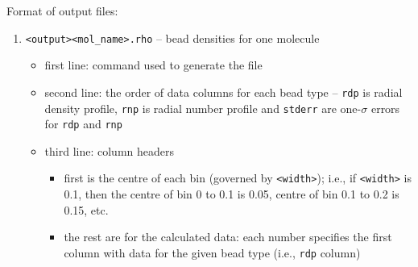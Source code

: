 \noindent
Format of output files:
\begin{enumerate}[nosep,leftmargin=20pt]
  \item \texttt{<output><mol\_name>.rho} -- bead densities for one molecule
    \begin{itemize}[nosep,leftmargin=5pt]
      \item first line: command used to generate the file
      \item second line: the order of data columns for each bead type --
        \texttt{rdp} is radial density profile, \texttt{rnp} is radial number
        profile and \texttt{stderr} are one-$\sigma$ errors for \texttt{rdp}
        and \texttt{rnp}
      \item third line: column headers
        \begin{itemize}[nosep,leftmargin=10pt]
          \item first is the centre of each bin (governed by
            \texttt{<width>}); i.e., if \texttt{<width>} is 0.1,
            then the centre of bin 0 to 0.1 is 0.05, centre of bin 0.1 to
            0.2 is 0.15, etc.
          \item the rest are for the calculated data: each number specifies
            the first column with data for the given bead type (i.e.,
            \texttt{rdp} column)
        \end{itemize}
    \end{itemize}
\end{enumerate}

